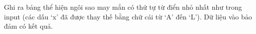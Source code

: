 Ghi ra bảng thể hiện ngôi sao may mắn có thứ tự từ điển nhỏ nhất như trong input (các dấu ‘x’ đã được thay thế bằng chữ cái từ ‘A’ đến ‘L’). Dữ liệu vào bảo đảm có kết quả.  

\